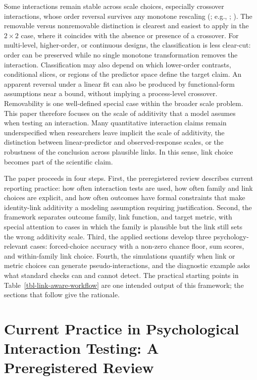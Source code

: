 \documentclass[
  man,
  longtable,
  nolmodern,
  notxfonts,
  notimes,
  colorlinks=true,linkcolor=blue,citecolor=blue,urlcolor=blue]{apa7}
\begin{document}
Some interactions remain stable across scale choices, especially
crossover interactions, whose order reversal survives any monotone
rescaling (; e.g.,
;
). The removable
versus nonremovable distinction is clearest and easiest to apply in the
\(2 \times 2\) case, where it coincides with the absence or presence of
a crossover. For multi-level, higher-order, or continuous designs, the
classification is less clear-cut: order can be preserved while no single
monotone transformation removes the interaction. Classification may also
depend on which lower-order contrasts, conditional slices, or regions of
the predictor space define the target claim. An apparent reversal under
a linear fit can also be produced by functional-form assumptions near a
bound, without implying a process-level crossover. Removability is one
well-defined special case within the broader scale problem. This paper
therefore focuses on the scale of additivity that a model assumes when
testing an interaction. Many quantitative interaction claims remain
underspecified when researchers leave implicit the scale of additivity,
the distinction between linear-predictor and observed-response scales,
or the robustness of the conclusion across plausible links. In this
sense, link choice becomes part of the scientific claim.

The paper proceeds in four steps. First, the preregistered review
describes current reporting practice: how often interaction tests are
used, how often family and link choices are explicit, and how often
outcomes have formal constraints that make identity-link additivity a
modeling assumption requiring justification. Second, the framework
separates outcome family, link function, and target metric, with special
attention to cases in which the family is plausible but the link still
sets the wrong additivity scale. Third, the applied sections develop
three psychology-relevant cases: forced-choice accuracy with a non-zero
chance floor, sum scores, and within-family link choice. Fourth, the
simulations quantify when link or metric choices can generate
pseudo-interactions, and the diagnostic example asks what standard
checks can and cannot detect. The practical starting points in
Table~\ref{tbl-link-aware-workflow} are one intended output of this
framework; the sections that follow give the rationale.

\section{Current Practice in Psychological Interaction Testing: A
Preregistered
Review}\label{current-practice-in-psychological-interaction-testing-a-preregistered-review}
\end{document}
